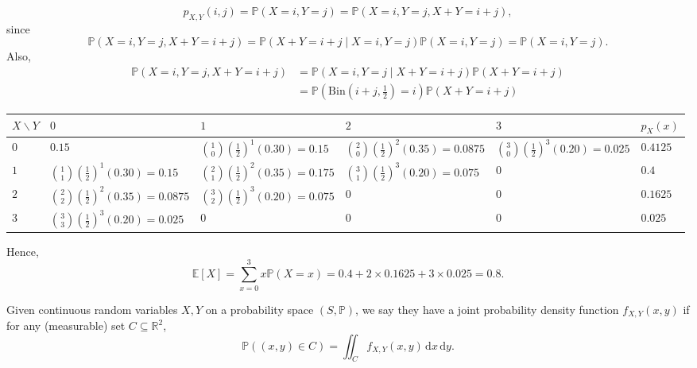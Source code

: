 \begin{explanation}
    \[
        p_{X, Y} (i, j) = \mathbb{P} (X = i, Y = j) = \mathbb{P} (X=i, Y=j, X+Y=i+j),
    \]
    since
    \[
        \mathbb{P} (X=i, Y=j, X+Y=i+j) = \mathbb{P} (X+Y=i+j \mid X=i, Y=j) \mathbb{P} (X = i, Y = j) = \mathbb{P} (X = i, Y = j).
    \]
    Also,
    \begin{align*}
        \mathbb{P} (X = i, Y = j, X + Y = i + j) &= \mathbb{P} (X = i, Y = j \mid X + Y = i + j) \mathbb{P} (X + Y = i + j) \\
        &= \mathbb{P} (\mathrm{Bin} \left( i+j, \frac{1}{2} \right) = i) \mathbb{P} (X+Y = i + j)
    \end{align*}
    \begin{table}[H]
    \centering
    \renewcommand{\arraystretch}{1.8}
    \setlength{\tabcolsep}{10pt}
    \begin{tabular}{|>{\centering\arraybackslash}m{1.3cm}|>{\centering\arraybackslash}m{2.7cm}|>{\centering\arraybackslash}m{2.7cm}|>{\centering\arraybackslash}m{2.7cm}|>{\centering\arraybackslash}m{2.2cm}|>{\centering\arraybackslash}m{1.8cm}|}
    \hline
    $X \backslash Y$ & $0$ & $1$ & $2$ & $3$ & $p_X(x)$ \\
    \hline
    $0$ &
    $0.15$ &
    $\binom{1}{0}\left(\tfrac12\right)^1(0.30)=0.15$ &
    $\binom{2}{0}\left(\tfrac12\right)^2(0.35)=0.0875$ &
    $\binom{3}{0}\left(\tfrac12\right)^3(0.20)=0.025$ &
    $0.4125$ \\
    \hline
    $1$ &
    $\binom{1}{1}\left(\tfrac12\right)^1(0.30)=0.15$ &
    $\binom{2}{1}\left(\tfrac12\right)^2(0.35)=0.175$ &
    $\binom{3}{1}\left(\tfrac12\right)^3(0.20)=0.075$ &
    $0$ &
    $0.4$ \\
    \hline
    $2$ &
    $\binom{2}{2}\left(\tfrac12\right)^2(0.35)=0.0875$ &
    $\binom{3}{2}\left(\tfrac12\right)^3(0.20)=0.075$ &
    $0$ &
    $0$ &
    $0.1625$ \\
    \hline
    $3$ &
    $\binom{3}{3}\left(\tfrac12\right)^3(0.20)=0.025$ &
    $0$ &
    $0$ &
    $0$ &
    $0.025$ \\
    \hline
    \end{tabular}
    \end{table}
    Hence,
    \[
        \mathbb{E} [X] = \sum_{x=0}^3 x \mathbb{P} (X = x) = 0.4 + 2 \times 0.1625 + 3 \times 0.025 = 0.8.
    \]
\end{explanation}

\begin{definition}
    Given continuous random variables \(X, Y\) on a probability space \((S, \mathbb{P})\), we say they have a joint probability density function \(f_{X, Y} (x, y)\) if for any (measurable) set \(C \subseteq \mathbb{R} ^2\),
    \[
        \mathbb{P} ((x, y) \in C) = \iint_C f_{X, Y}(x, y) \, \mathrm{d} x \, \mathrm{d} y.   
    \]    
\end{definition}

